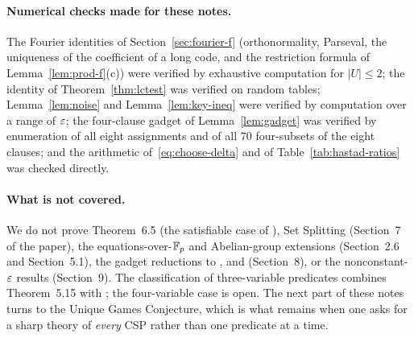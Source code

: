 \paragraph{Numerical checks made for these notes.}
The Fourier identities of Section~\ref{sec:fourier-f} (orthonormality, Parseval, the uniqueness of the coefficient of a long code, and the restriction formula of Lemma~\ref{lem:prod-f}(c)) were verified by exhaustive computation for $|U|\le2$; the identity of Theorem~\ref{thm:lctest} was verified on random tables; Lemma~\ref{lem:noise} and Lemma~\ref{lem:key-ineq} were verified by computation over a range of $\varepsilon$; the four-clause gadget of Lemma~\ref{lem:gadget} was verified by enumeration of all eight assignments and of all $70$ four-subsets of the eight clauses; and the arithmetic of~\eqref{eq:choose-delta} and of Table~\ref{tab:hastad-ratios} was checked directly.

\paragraph{What is not covered.}
We do not prove Theorem~6.5 (the satisfiable case of ), Set Splitting (Section~7 of the paper), the equations-over-$\mathbb{F}_p$ and Abelian-group extensions (Section~2.6 and Section~5.1), the gadget reductions to ,  and  (Section~8), or the nonconstant-$\varepsilon$ results (Section~9).  The classification of three-variable predicates combines Theorem~5.15 with \citet{Zwick98}; the four-variable case is open.
The next part of these notes turns to the Unique Games Conjecture, which is what remains when one asks for a sharp theory of \emph{every} CSP rather than one predicate at a time.
